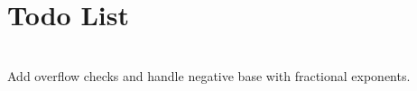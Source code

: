 \chapter{Todo List }
\hypertarget{todo}{}\label{todo}

\begin{DoxyRefList}
\item[{\parbox[t]{\linewidth}{Member \doxylink{class_calculation_engine_a9019abe6d98dbc8ad8010545ed3ee1d6}{Calculation\+Engine::power\+\_\+calculation} (double base, double exponent)}}]\hfill \\
\label{todo__todo000001}%
%
Add overflow checks and handle negative base with fractional exponents. 
\end{DoxyRefList}